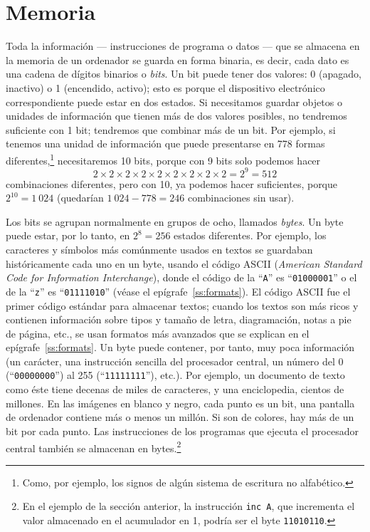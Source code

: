\section{Memoria} \label{ss:memoria} 

Toda la información --- instrucciones de programa o datos --- que se almacena en la memoria de un ordenador se guarda en forma binaria, es decir, cada dato es una cadena de dígitos binarios o \emph{bits}. Un bit puede tener dos valores: 0 (apagado, inactivo) o 1 (encendido, activo); esto es porque el dispositivo electrónico correspondiente puede estar en dos estados. Si necesitamos guardar objetos o unidades de información que tienen más de dos valores posibles, no tendremos suficiente con 1 bit; tendremos que combinar más de un bit. Por ejemplo, si tenemos una unidad de información que puede presentarse en 778 formas diferentes,\footnote{Como, por ejemplo, los signos de algún sistema de escritura no alfabético.} necesitaremos 10 bits, porque con 9 bits solo podemos hacer $$2 \times 2 \times 2 \times 2 \times 2 \times 2 \times 2 \times 2 \times 2 = 2^9 = 512$$ combinaciones diferentes, pero con 10, ya podemos hacer suficientes, porque $2^{10}=1~024$ (quedarían $1~024-778=246$ combinaciones sin usar). 

Los bits se agrupan normalmente en grupos de ocho, llamados \emph{bytes}. Un byte puede estar, por lo tanto, en $2^8=256$ estados diferentes. Por ejemplo, los caracteres y símbolos más comúnmente usados en textos se guardaban históricamente cada uno en un byte, usando el código ASCII\label{pg:ASCII} (\emph{American Standard Code for Information Interchange}), donde el código de la ``{\tt A}'' es ``{\tt 01000001}'' o el de la ``{\tt z}'' es ``{\tt 01111010}'' (véase el epígrafe~\ref{ss:formats}). El código ASCII fue el primer código estándar para almacenar textos; cuando los textos son más ricos y contienen información sobre tipos y tamaño de letra, diagramación, notas a pie de página, etc., se usan formatos más avanzados que se explican en el epígrafe~\ref{ss:formats}. Un byte puede contener, por tanto, muy poca información (un carácter, una instrucción sencilla del procesador central, un número del 0 (``{\tt 00000000}'') al 255 (``{\tt 11111111}''), etc.). Por ejemplo, un documento de texto como éste tiene decenas de miles de caracteres, y una enciclopedia, cientos de millones. En las imágenes en blanco y negro, cada punto es un bit, una pantalla de ordenador contiene más o menos un millón. Si son de colores, hay más de un bit por cada punto. Las instrucciones de los programas que ejecuta el procesador central también se almacenan en bytes.\footnote{En el ejemplo de la sección anterior, la instrucción {\tt inc A}, que incrementa el valor almacenado en el acumulador en 1, podría ser el byte {\tt 11010110}.} 

